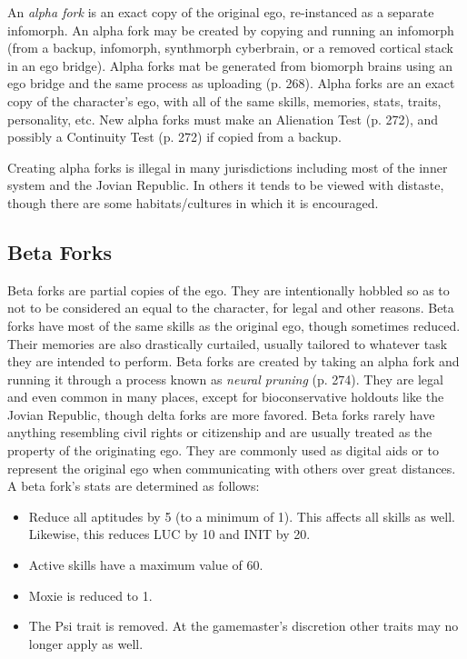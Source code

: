 An \textit{alpha fork} is an exact copy of the original ego, 
re-instanced as a separate infomorph. An alpha fork 
may be created by copying and running an infomorph 
(from a backup, infomorph, synthmorph cyberbrain, 
or a removed cortical stack in an ego bridge). Alpha 
forks mat be generated from biomorph brains using 
an ego bridge and the same process as uploading (p. 
268). Alpha forks are an exact copy of the character's
ego, with all of the same skills, memories, stats,
traits, personality, etc. New alpha forks must make 
an Alienation Test (p. 272), and possibly a Continuity 
Test (p. 272) if copied from a backup.

Creating alpha forks is illegal in many jurisdictions
including most of the inner system and the
Jovian Republic. In others it tends to be viewed with 
distaste, though there are some habitats/cultures in 
which it is encouraged.

\subsection{Beta Forks}

Beta forks are partial copies of the ego. They are 
intentionally hobbled so as to not to be considered 
an equal to the character, for legal and other reasons. 
Beta forks have most of the same skills as the original 
ego, though sometimes reduced. Their memories are 
also drastically curtailed, usually tailored to whatever 
task they are intended to perform.
Beta forks are created by taking an alpha fork and 
running it through a process known as \textit{neural pruning} 
(p. 274). They are legal and even common in many 
places, except for bioconservative holdouts like the 
Jovian Republic, though delta forks are more favored. 
Beta forks rarely have anything resembling civil rights 
or citizenship and are usually treated as the property 
of the originating ego. They are commonly used as 
digital aids or to represent the original ego when communicating
with others over great distances. \\
A beta fork's stats are determined as follows:

\begin{itemize}
\item Reduce all aptitudes by 5 (to a minimum of 1). 
This affects all skills as well. Likewise, this reduces
LUC by 10 and INIT by 20.
\item Active skills have a maximum value of 60.
\item Moxie is reduced to 1.
\item The Psi trait is removed. At the gamemaster's discretion
other traits may no longer apply as well.
\end{itemize}

